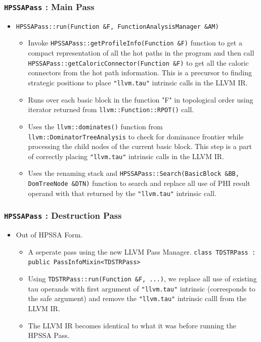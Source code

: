 \documentclass{beamer}
\begin{document}
\begin{frame}
	\frametitle{\texttt{HPSSAPass} : Main Pass}
	\begin{itemize}
		\item \texttt{HPSSAPass::run(Function \&F, FunctionAnalysisManager \&AM)} 
		\begin{itemize}
			\footnotesize
			\item Invoke \texttt{HPSSAPass::getProfileInfo(Function \&F)} function to get a compact representation of all the \color{red} hot paths \color{black} in the program and then call \texttt{HPSSAPass::getCaloricConnector(Function \&F)} to get all the caloric connectors from the \color{red} hot path \color{black} information. This is a precursor to finding strategic positions to place \texttt{"llvm.tau"} intrinsic calls in the LLVM IR.
			\item Runs over each basic block in the function "F" in topological order using iterator returned from \texttt{llvm::Function::RPOT()} call.
			\item Uses the \texttt{llvm::dominates()} function from \texttt{llvm::DominatorTreeAnalysis} to check for dominance frontier while processing the child nodes of the current basic block. This step is a part of correctly placing \texttt{"llvm.tau"} intrinsic calls in the LLVM IR. 
			\item Uses the renaming stack and \texttt{HPSSAPass::Search(BasicBlock \&BB, DomTreeNode \&DTN)} function to search and replace all use of PHI result operand with that returned by the \texttt{"llvm.tau"} intrinsic call.
		\end{itemize}
	\end{itemize}
\end{frame}

\begin{frame}
	\frametitle{\texttt{HPSSAPass} : Destruction Pass}
	\begin{itemize}
		\item Out of HPSSA Form. 
		\begin{itemize}
			\item A seperate pass using the new LLVM Pass Manager. \texttt{class TDSTRPass : public PassInfoMixin<TDSTRPass>}
			\item Using \texttt{TDSTRPass::run(Function \&F, ...)}, we replace all use of existing tau operands with first argument of  \texttt{"llvm.tau"} intrinsic (corresponds to the safe argument) and remove the \texttt{"llvm.tau"} intrinsic calll from the LLVM IR.
			\item The LLVM IR becomes identical to what it was before running the HPSSA Pass. 
		\end{itemize}
	\end{itemize}
\end{frame}
\end{document}
